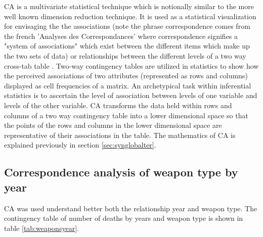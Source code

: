CA is a multivariate statistical technique which is notionally similar to the more well known dimension reduction technique. It is used as a statistical visualization for envisaging the the associations (note the phrase correspondence comes from the french 'Analyses des Correspondances' where correspondence signifies a "system of associations" which exist between the different items which make up the two sets of data) or relationships between the different levels of a two way cross-tab table \citep{husson2010exploratory}. Two-way contingency tables are utilized in statistics to show how the perceived associations of two attributes (represented as rows and columns) displayed as cell frequencies of a matrix. An archetypical task within inferential statistics is to  ascertain the level of association between levels of one variable and levels of the other variable. CA transforms the data held within rows and columns of a two way contingency table into a lower dimensional space so that the points of the rows and columns in the lower dimensional space are representative of their associations in the table. The mathematics of CA is explained previously in section \ref{sec:synglobalter}.  

\subsection{Correspondence analysis of weapon type by year}\label{viewing-deaths-by-weapon-vector-type-CA}

CA was used understand better both the relationship year and weapon type. The contingency table of number of deaths by years and weapon type is shown in table \ref{tab:weaponsyear}.



